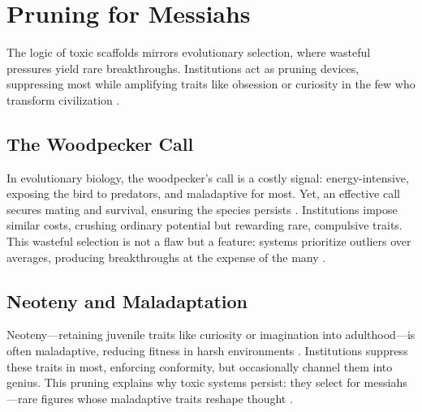 \documentclass[12pt]{article}
\begin{document}
\section{Pruning for Messiahs}
The logic of toxic scaffolds mirrors evolutionary selection, where wasteful pressures yield rare breakthroughs. Institutions act as pruning devices, suppressing most while amplifying traits like obsession or curiosity in the few who transform civilization \citep{henrich2016secret}.

\subsection{The Woodpecker Call}
In evolutionary biology, the woodpecker’s call is a costly signal: energy-intensive, exposing the bird to predators, and maladaptive for most. Yet, an effective call secures mating and survival, ensuring the species persists \citep{zahavi1997handicap}. Institutions impose similar costs, crushing ordinary potential but rewarding rare, compulsive traits. This wasteful selection is not a flaw but a feature: systems prioritize outliers over averages, producing breakthroughs at the expense of the many \citep{graeber2018bullshit}.

\subsection{Neoteny and Maladaptation}
Neoteny—retaining juvenile traits like curiosity or imagination into adulthood—is often maladaptive, reducing fitness in harsh environments \citep{gould1977ontogeny, belsky1991childhood}. Institutions suppress these traits in most, enforcing conformity, but occasionally channel them into genius. This pruning explains why toxic systems persist: they select for messiahs—rare figures whose maladaptive traits reshape thought \citep{card1991xenocide}.
\end{document}
